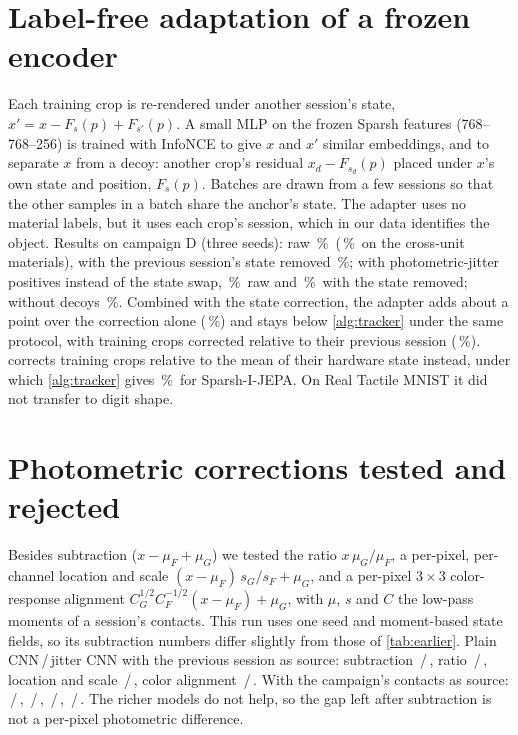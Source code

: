 \documentclass[10pt,twocolumn,letterpaper]{article}
\newcommand{\pct}{\,\%}
\newcommand{\af}[2]{#1\,/\,#2}
\begin{document}
\section{Label-free adaptation of a frozen encoder}
Each training crop is re-rendered under another session's state, $x' = x - F_s(p) + F_{s'}(p)$. A small MLP on the frozen Sparsh features (768--768--256) is trained with InfoNCE to give $x$ and $x'$ similar embeddings, and to separate $x$ from a decoy: another crop's residual $x_d - F_{s_d}(p)$ placed under $x$'s own state and position, $F_s(p)$. Batches are drawn from a few sessions so that the other samples in a batch share the anchor's state. The adapter uses no material labels, but it uses each crop's session, which in our data identifies the object. Results on campaign D (three seeds): raw \IjepaAdAcc\pct\ (\DOneIjepaAd\pct\ on the cross-unit materials), with the previous session's state removed \IjepaAdPrevAcc\pct; with photometric-jitter positives instead of the state swap, \IjepaAdJitterAcc\pct\ raw and \IjepaAdJitterPrevAcc\pct\ with the state removed; without decoys \IjepaAdNoDecoyAcc\pct. Combined with the state correction, the adapter adds about a point over the correction alone (\IjepaPrevAcc\pct) and stays below \cref{alg:tracker} under the same protocol, with training crops corrected relative to their previous session (\IjepaTrkFrAcc\pct).  corrects training crops relative to the mean of their hardware state instead, under which \cref{alg:tracker} gives \IjepaTrkStAcc\pct\ for Sparsh-I-JEPA. On Real Tactile MNIST it did not transfer to digit shape.

\section{Photometric corrections tested and rejected}
Besides subtraction ($x-\mu_F+\mu_G$) we tested the ratio $x\,\mu_G/\mu_F$, a per-pixel, per-channel location and scale $(x-\mu_F)\,s_G/s_F+\mu_G$, and a per-pixel $3\times3$ color-response alignment $C_G^{1/2}C_F^{-1/2}(x-\mu_F)+\mu_G$, with $\mu$, $s$ and $C$ the low-pass moments of a session's contacts. This run uses one seed and moment-based state fields, so its subtraction numbers differ slightly from those of \cref{tab:earlier}. Plain CNN\,/\,jitter CNN with the previous session as source: subtraction \af{\GngSupSubPrev}{\GngAugSubPrev}, ratio \af{\GngSupRatioPrev}{\GngAugRatioPrev}, location and scale \af{\GngSupLocscalePrev}{\GngAugLocscalePrev}, color alignment \af{\GngSupColorPrev}{\GngAugColorPrev}. With the campaign's contacts as source: \af{\GngSupSubCamp}{\GngAugSubCamp}, \af{\GngSupRatioCamp}{\GngAugRatioCamp}, \af{\GngSupLocscaleCamp}{\GngAugLocscaleCamp}, \af{\GngSupColorCamp}{\GngAugColorCamp}. The richer models do not help, so the gap left after subtraction is not a per-pixel photometric difference.
\end{document}
